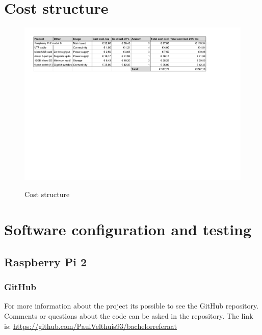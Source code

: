 \documentclass{sig-alternate-br}
\begin{document}

%
%
\vspace{50 mm}


\clearpage
\appendix

\section{Cost structure}\label{sec:cost}
\begin{figure}[H]
	\includegraphics[scale=0.65]{cost_cluster.pdf}
	\label{fig:cost}
	\caption{Cost structure}
\end{figure}


\section{Software configuration and testing}\label{sec:software}

\subsection{Raspberry Pi 2}

\subsubsection{GitHub}
For more information about the project its possible to see the GitHub repository. Comments or questions about the code can be asked in the repository. \newline
The link is: \newline
\url{https://github.com/PaulVelthuis93/bachelorreferaat}
\end{document}
